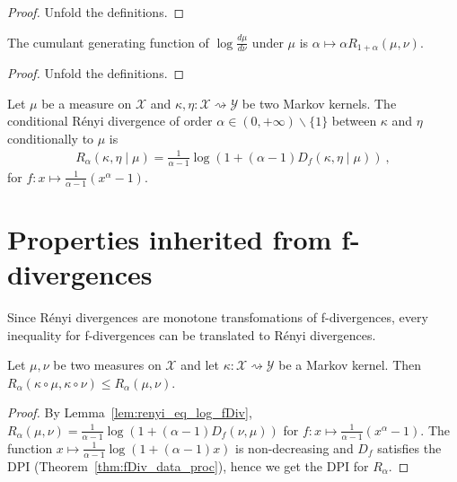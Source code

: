 \begin{proof}
Unfold the definitions.
\end{proof}

\begin{lemma}
  \label{lem:renyi_cgf_2}
  The cumulant generating function of $\log\frac{d\mu}{d\nu}$ under $\mu$ is $\alpha \mapsto \alpha R_{1+\alpha}(\mu, \nu)$.
\end{lemma}

\begin{proof}
Unfold the definitions.
\end{proof}

\begin{definition}
  \label{def:condRenyi}
  Let $\mu$ be a measure on $\mathcal X$ and $\kappa, \eta : \mathcal X \rightsquigarrow \mathcal Y$ be two Markov kernels. The conditional Rényi divergence of order $\alpha \in (0,+\infty) \backslash \{1\}$ between $\kappa$ and $\eta$ conditionally to $\mu$ is
  \begin{align*}
  R_\alpha(\kappa, \eta \mid \mu) =\frac{1}{\alpha - 1} \log (1 + (\alpha - 1) D_f(\kappa, \eta \mid \mu)) \: ,
  \end{align*}
  for $f : x \mapsto \frac{1}{\alpha - 1}(x^{\alpha} - 1)$.
\end{definition}

\section{Properties inherited from f-divergences}

Since Rényi divergences are monotone transfomations of f-divergences, every inequality for f-divergences can be translated to Rényi divergences.

\begin{theorem}
  \label{thm:renyi_data_proc}
  Let $\mu, \nu$ be two measures on $\mathcal X$ and let $\kappa : \mathcal X \rightsquigarrow \mathcal Y$ be a Markov kernel.
  Then $R_\alpha(\kappa \circ \mu, \kappa \circ \nu) \le R_\alpha(\mu, \nu)$.
\end{theorem}

\begin{proof}
By Lemma~\ref{lem:renyi_eq_log_fDiv}, $R_\alpha(\mu, \nu) = \frac{1}{\alpha - 1} \log (1 + (\alpha - 1) D_f(\nu, \mu))$ for $f : x \mapsto \frac{1}{\alpha - 1}(x^{\alpha} - 1)$.
The function $x \mapsto \frac{1}{\alpha - 1}\log (1 + (\alpha - 1)x)$ is non-decreasing and $D_f$ satisfies the DPI (Theorem~\ref{thm:fDiv_data_proc}), hence we get the DPI for $R_\alpha$.
\end{proof}


